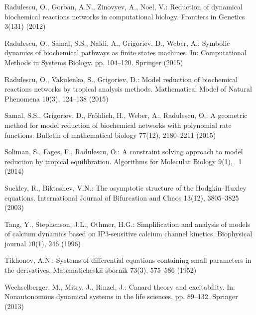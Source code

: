 \documentclass{llncs}
\begin{document}
\begin{thebibliography}{10}
Radulescu, O., Gorban, A.N., Zinovyev, A., Noel, V.: {Reduction of dynamical
  biochemical reactions networks in computational biology}. Frontiers in
  Genetics  3(131) (2012)

Radulescu, O., Samal, S.S., Naldi, A., Grigoriev, D., Weber, A.: Symbolic
  dynamics of biochemical pathways as finite states machines. In: Computational
  Methods in Systems Biology. pp. 104--120. Springer (2015)

Radulescu, O., Vakulenko, S., Grigoriev, D.: Model reduction of biochemical
  reactions networks by tropical analysis methods. Mathematical Model of
  Natural Phenomena  10(3),  124--138 (2015)

Samal, S.S., Grigoriev, D., Fr{\"o}hlich, H., Weber, A., Radulescu, O.: A
  geometric method for model reduction of biochemical networks with polynomial
  rate functions. Bulletin of mathematical biology  77(12),  2180--2211 (2015)

Soliman, S., Fages, F., Radulescu, O.: A constraint solving approach to model
  reduction by tropical equilibration. Algorithms for Molecular Biology  9(1),
  ~1 (2014)

Suckley, R., Biktashev, V.N.: {The asymptotic structure of the Hodgkin--Huxley
  equations}. International Journal of Bifurcation and Chaos  13(12),
  3805--3825 (2003)

Tang, Y., Stephenson, J.L., Othmer, H.G.: {Simplification and analysis of
  models of calcium dynamics based on IP3-sensitive calcium channel kinetics.}
  Biophysical journal  70(1),  246 (1996)

Tikhonov, A.N.: {Systems of differential equations containing small parameters
  in the derivatives}. Matematicheskii sbornik  73(3),  575--586 (1952)

Wechselberger, M., Mitry, J., Rinzel, J.: Canard theory and excitability. In:
  Nonautonomous dynamical systems in the life sciences, pp. 89--132. Springer
  (2013)

\end{thebibliography}





	
\end{document}

